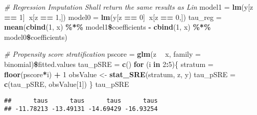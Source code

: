 \documentclass[]{article}
\newenvironment{Shaded}{\begin{snugshade}}{\end{snugshade}}
\newcommand{\KeywordTok}[1]{\textcolor[rgb]{0.13,0.29,0.53}{\textbf{#1}}}
\newcommand{\DataTypeTok}[1]{\textcolor[rgb]{0.13,0.29,0.53}{#1}}
\newcommand{\DecValTok}[1]{\textcolor[rgb]{0.00,0.00,0.81}{#1}}
\newcommand{\StringTok}[1]{\textcolor[rgb]{0.31,0.60,0.02}{#1}}
\newcommand{\CommentTok}[1]{\textcolor[rgb]{0.56,0.35,0.01}{\textit{#1}}}
\newcommand{\ControlFlowTok}[1]{\textcolor[rgb]{0.13,0.29,0.53}{\textbf{#1}}}
\newcommand{\OperatorTok}[1]{\textcolor[rgb]{0.81,0.36,0.00}{\textbf{#1}}}
\newcommand{\NormalTok}[1]{#1}
\begin{document}
\begin{Shaded}
\begin{Highlighting}[]
\CommentTok{# Regression Imputation Shall return the same results as Lin}
\NormalTok{model1 =}\StringTok{ }\KeywordTok{lm}\NormalTok{(y[z }\OperatorTok{==}\StringTok{ }\DecValTok{1}\NormalTok{]}\OperatorTok{~}\NormalTok{x[z }\OperatorTok{==}\StringTok{ }\DecValTok{1}\NormalTok{,])}
\NormalTok{model0 =}\StringTok{ }\KeywordTok{lm}\NormalTok{(y[z }\OperatorTok{==}\StringTok{ }\DecValTok{0}\NormalTok{]}\OperatorTok{~}\NormalTok{x[z }\OperatorTok{==}\StringTok{ }\DecValTok{0}\NormalTok{,])}
\NormalTok{tau_reg =}\StringTok{ }\KeywordTok{mean}\NormalTok{(}\KeywordTok{cbind}\NormalTok{(}\DecValTok{1}\NormalTok{, x) }\OperatorTok{\%*\%}\StringTok{ }\NormalTok{model1}\OperatorTok{\$}\NormalTok{coefficients }\OperatorTok{-}\StringTok{ }\KeywordTok{cbind}\NormalTok{(}\DecValTok{1}\NormalTok{, x) }\OperatorTok{\%*\%}\StringTok{ }\NormalTok{model0}\OperatorTok{\$}\NormalTok{coefficients)}

\CommentTok{# Propensity score stratification}
\NormalTok{pscore =}\StringTok{ }\KeywordTok{glm}\NormalTok{(z }\OperatorTok{~}\StringTok{ }\NormalTok{x, }\DataTypeTok{family =}\NormalTok{ binomial)}\OperatorTok{\$}\NormalTok{fitted.values}
\NormalTok{tau_pSRE =}\StringTok{ }\KeywordTok{c}\NormalTok{()}
\ControlFlowTok{for}\NormalTok{ (i }\ControlFlowTok{in} \DecValTok{2}\OperatorTok{:}\DecValTok{5}\NormalTok{)\{}
\NormalTok{  stratum =}\StringTok{ }\KeywordTok{floor}\NormalTok{(pscore}\OperatorTok{*}\NormalTok{i) }\OperatorTok{+}\StringTok{ }\DecValTok{1}
\NormalTok{  obsValue <-}\StringTok{ }\KeywordTok{stat_SRE}\NormalTok{(stratum, z, y)}
\NormalTok{  tau_pSRE =}\StringTok{ }\KeywordTok{c}\NormalTok{(tau_pSRE, obsValue[}\DecValTok{1}\NormalTok{])}
\NormalTok{\}}
\NormalTok{tau_pSRE}
\end{Highlighting}
\end{Shaded}

\begin{verbatim}
##      taus      taus      taus      taus 
## -11.78213 -13.49131 -14.69429 -16.93254
\end{verbatim}
\end{document}
